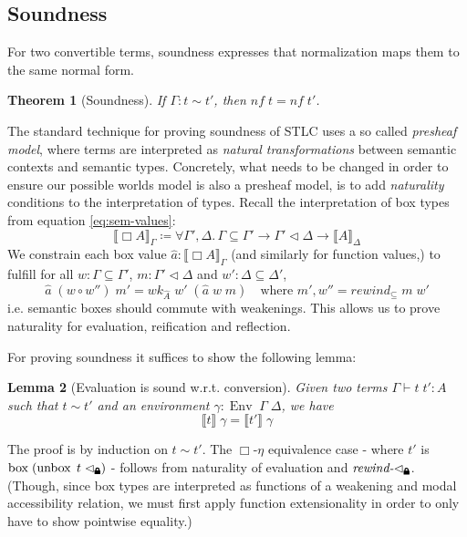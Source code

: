 \documentclass{article}
\newtheorem{theorem}{Theorem}
\newtheorem{lemma}[theorem]{Lemma}
\theoremstyle{definition}\newtheorem{definition}{Definition}
\newcommand{\lock}{\text{\tikz[baseline]{
      \fill[rounded corners=.1ex] (-.75ex,0) rectangle (.75ex,1ex);
      \draw[line width=.3ex] (-.4ex,.5ex) -- ++(0,.75ex) arc (180:0:.4ex) -- ++(0,-.75ex);
}}}
\begin{document}
\subsection{Soundness}

For two convertible terms,
soundness expresses that normalization maps them to the same normal form.
\begin{theorem}[Soundness]
  If $\Gamma : t \sim t'$, then $\textit{nf} \; t = \textit{nf} \; t'$.
\end{theorem}

The standard technique for proving soundness of STLC \cite{altenkirch95}
uses a so called \emph{presheaf model},
where terms are interpreted as \emph{natural transformations}
between semantic contexts and semantic types.
Concretely, what needs to be changed in order to ensure
our possible worlds model is also a presheaf model,
is to add \emph{naturality} conditions to the interpretation of types.
Recall the interpretation of box types from equation \eqref{eq:sem-values}:
$$ \llbracket \Box A \rrbracket_\Gamma \coloneqq \forall \Gamma', \Delta. \, \Gamma \subseteq \Gamma' \to \Gamma'\lhd\Delta \to \llbracket A \rrbracket_\Delta $$
We constrain each box value $\hat a : \llbracket \Box A \rrbracket_\Gamma$
(and similarly for function values,)
to fulfill for all $w : \Gamma \subseteq \Gamma'$, $m : \Gamma' \lhd \Delta$ and $w' : \Delta \subseteq \Delta'$,
$$ \hat a \; (w \circ w'') \; m' = \textit{wk}_{\widehat A} \; w' \; (\hat a \; w \; m) \quad \text{where } m' , w'' = \textit{rewind}_\subseteq \; m \; w' $$
i.e. semantic boxes should commute with weakenings.
This allows us to prove naturality for evaluation, reification and reflection.

For proving soundness it suffices to show the following lemma:
\begin{lemma}[Evaluation is sound w.r.t. conversion]
  Given two terms $\Gamma \vdash t \; t' : A$ such that $t \sim t'$
  and an environment $\gamma : \operatorname{Env} \; \Gamma \; \Delta$,
  we have
  $$ \llbracket t \rrbracket \; \gamma = \llbracket t' \rrbracket \; \gamma $$
\end{lemma}
The proof is by induction on $t \sim t'$.
The $\Box\text{-}\eta$ equivalence case -
where $t'$ is $\operatorname{box} \; (\operatorname{unbox} \; t \; \lhd_\lock)$ -
follows from naturality of evaluation and $\textit{rewind-}\lhd_\lock$.
(Though, since box types are interpreted as functions
of a weakening and modal accessibility relation,
we must first apply function extensionality
in order to only have to show pointwise equality.)
\end{document}
